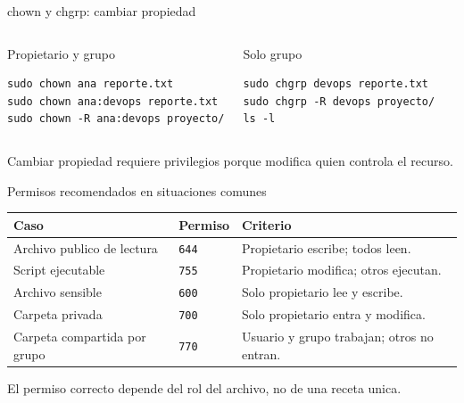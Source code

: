 \documentclass[aspectratio=169]{beamer}
\begin{document}
\begin{frame}[fragile]{chown y chgrp: cambiar propiedad}
  \small
  \begin{columns}[t]
    \begin{block}{Propietario y grupo}
\begin{verbatim}
sudo chown ana reporte.txt
sudo chown ana:devops reporte.txt
sudo chown -R ana:devops proyecto/
\end{verbatim}
    \end{block}
    \begin{block}{Solo grupo}
\begin{verbatim}
sudo chgrp devops reporte.txt
sudo chgrp -R devops proyecto/
ls -l
\end{verbatim}
    \end{block}
  \end{columns}
  \vfill
  \small Cambiar propiedad requiere privilegios porque modifica quien controla el recurso.
\end{frame}

\begin{frame}{Permisos recomendados en situaciones comunes}
  \footnotesize
  \begin{center}
  \begin{tabular}{p{} p{} p{}}
    \toprule
    Caso & Permiso & Criterio \\
    \midrule
    Archivo publico de lectura & \texttt{644} & Propietario escribe; todos leen. \\
    Script ejecutable & \texttt{755} & Propietario modifica; otros ejecutan. \\
    Archivo sensible & \texttt{600} & Solo propietario lee y escribe. \\
    Carpeta privada & \texttt{700} & Solo propietario entra y modifica. \\
    Carpeta compartida por grupo & \texttt{770} & Usuario y grupo trabajan; otros no entran. \\
    \bottomrule
  \end{tabular}
  \end{center}
  \vspace{0.25cm}
  \centering
  \small El permiso correcto depende del rol del archivo, no de una receta unica.
\end{frame}
\end{document}
